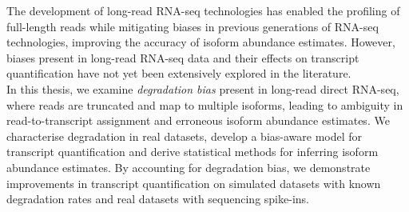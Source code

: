
The development of long-read RNA-seq technologies has enabled the profiling of full-length reads while mitigating biases in previous generations of RNA-seq technologies, improving the accuracy of isoform abundance estimates. However, biases present in long-read RNA-seq data and their effects on transcript quantification have not yet been extensively explored in the literature.\\[10pt] 
In this thesis, we examine \textit{degradation bias} present in long-read direct RNA-seq, where reads are truncated and map to multiple isoforms, leading to ambiguity in read-to-transcript assignment and erroneous isoform abundance estimates. We characterise degradation in real datasets, develop a bias-aware model for transcript quantification and derive statistical methods for inferring isoform abundance estimates. By accounting for degradation bias, we demonstrate improvements in transcript quantification on simulated datasets with known degradation rates and real datasets with sequencing spike-ins.

